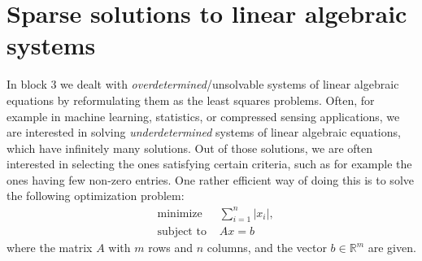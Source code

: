 \documentclass[10pt,a4paper]{article}
\theoremstyle{plain}
\theoremstyle{definition}
\begin{document}
\rhead{\today}

\fancyfoot[R] {\thepage}
\fancyfoot[C] {}

\section*{Sparse solutions to linear algebraic systems}

In block 3 we dealt with \emph{overdetermined}/unsolvable systems of linear algebraic equations by reformulating them as the least squares problems.
Often, for example in machine learning, statistics, or compressed sensing applications, we are interested in solving \emph{underdetermined} systems of linear algebraic equations, which have infinitely many solutions.
Out of those solutions, we are often interested in selecting  the ones satisfying certain criteria, such as for example the ones having few non-zero entries.
One rather efficient way of doing this is to solve the following optimization problem:
\begin{equation}\label{prob:sparse}
  \begin{aligned}
    &\text{minimize\ }& \sum_{i=1}^n |x_i|,\\
    &\text{subject to\ }& Ax=b
  \end{aligned}
\end{equation}
where the matrix \(A\) with \(m\) rows and \(n\) columns,
and the vector \(b\in \mathbb{R}^m\) are given.
\end{document}
